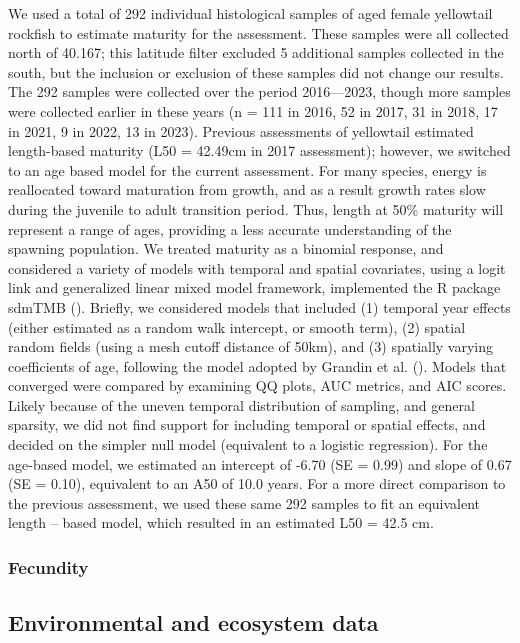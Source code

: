 \documentclass[
]{scrartcl}
\begin{document}
We used a total of 292 individual histological samples of aged female
yellowtail rockfish to estimate maturity for the assessment. These
samples were all collected north of 40.167; this latitude filter
excluded 5 additional samples collected in the south, but the inclusion
or exclusion of these samples did not change our results. The 292
samples were collected over the period 2016---2023, though more samples
were collected earlier in these years (n = 111 in 2016, 52 in 2017, 31
in 2018, 17 in 2021, 9 in 2022, 13 in 2023). Previous assessments of
yellowtail estimated length-based maturity (L50 = 42.49cm in 2017
assessment); however, we switched to an age based model for the current
assessment. For many species, energy is reallocated toward maturation
from growth, and as a result growth rates slow during the juvenile to
adult transition period. Thus, length at 50\% maturity will represent a
range of ages, providing a less accurate understanding of the spawning
population. We treated maturity as a binomial response, and considered a
variety of models with temporal and spatial covariates, using a logit
link and generalized linear mixed model framework, implemented the R
package sdmTMB ().
Briefly, we considered models that included (1) temporal year effects
(either estimated as a random walk intercept, or smooth term), (2)
spatial random fields (using a mesh cutoff distance of 50km), and (3)
spatially varying coefficients of age, following the model adopted by
Grandin et al. (). Models that
converged were compared by examining QQ plots, AUC metrics, and AIC
scores. Likely because of the uneven temporal distribution of sampling,
and general sparsity, we did not find support for including temporal or
spatial effects, and decided on the simpler null model (equivalent to a
logistic regression). For the age-based model, we estimated an intercept
of -6.70 (SE = 0.99) and slope of 0.67 (SE = 0.10), equivalent to an A50
of 10.0 years. For a more direct comparison to the previous assessment,
we used these same 292 samples to fit an equivalent length -- based
model, which resulted in an estimated L50 = 42.5 cm.

\subsubsection{Fecundity}\label{fecundity}

\subsection{Environmental and ecosystem
data}\label{environmental-and-ecosystem-data}
\end{document}
